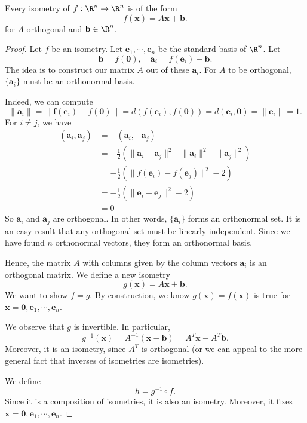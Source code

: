 \documentclass[a4paper]{article}
\begin{document}
\begin{thm}
  Every isometry of $f: \R^n \to \R^n$ is of the form
  \[
    f(\mathbf{x}) = A\mathbf{x} + \mathbf{b}.
  \]
  for $A$ orthogonal and $\mathbf{b} \in \R^n$.
\end{thm}

\begin{proof}
  Let $f$ be an isometry. Let $\mathbf{e}_1, \cdots, \mathbf{e}_n$ be the standard basis of $\R^n$. Let
  \[
    \mathbf{b} = f(\mathbf{0}), \quad \mathbf{a}_i = f(\mathbf{e}_i) - \mathbf{b}.
  \]
  The idea is to construct our matrix $A$ out of these $\mathbf{a}_i$. For $A$ to be orthogonal, $\{\mathbf{a}_i\}$ must be an orthonormal basis.

  Indeed, we can compute
  \[
    \|\mathbf{a}_i\| = \|\mathbf{f}(\mathbf{e}_i) - f(\mathbf{0})\| = d(f(\mathbf{e}_i), f(\mathbf{0})) = d(\mathbf{e}_i, \mathbf{0}) = \|\mathbf{e}_i\| = 1.
  \]
  For $i \not = j$, we have
  \begin{align*}
    (\mathbf{a}_i, \mathbf{a}_j) &= -(\mathbf{a}_i, -\mathbf{a}_j) \\
    &=-\frac{1}{2}(\|\mathbf{a}_i - \mathbf{a}_j\|^2 - \|\mathbf{a}_i\|^2 - \|\mathbf{a}_j\|^2)\\
    &= -\frac{1}{2}(\|f(\mathbf{e}_i) - f(\mathbf{e}_j)\|^2 - 2)\\
    &= -\frac{1}{2}(\|\mathbf{e}_i - \mathbf{e}_j\|^2 - 2)\\
    &= 0
  \end{align*}
  So $\mathbf{a}_i$ and $\mathbf{a}_j$ are orthogonal. In other words, $\{\mathbf{a}_i\}$ forms an orthonormal set. It is an easy result that any orthogonal set must be linearly independent. Since we have found $n$ orthonormal vectors, they form an orthonormal basis.

  Hence, the matrix $A$ with columns given by the column vectors $\mathbf{a}_i$ is an orthogonal matrix. We define a new isometry
  \[
    g(\mathbf{x}) = A\mathbf{x} + \mathbf{b}.
  \]
  We want to show $f = g$. By construction, we know $g(\mathbf{x}) = f(\mathbf{x})$ is true for $\mathbf{x} = \mathbf{0}, \mathbf{e}_1, \cdots, \mathbf{e}_n$.

  We observe that $g$ is invertible. In particular,
  \[
    g^{-1}(\mathbf{x}) = A^{-1}(\mathbf{x} - \mathbf{b}) = A^T \mathbf{x} - A^T\mathbf{b}.
  \]
  Moreover, it is an isometry, since $A^T$ is orthogonal (or we can appeal to the more general fact that inverses of isometries are isometries).

  We define
  \[
    h = g^{-1}\circ f.
  \]
  Since it is a composition of isometries, it is also an isometry. Moreover, it fixes $\mathbf{x} = \mathbf{0}, \mathbf{e}_1, \cdots, \mathbf{e}_n$.


\end{proof}
\end{document}
